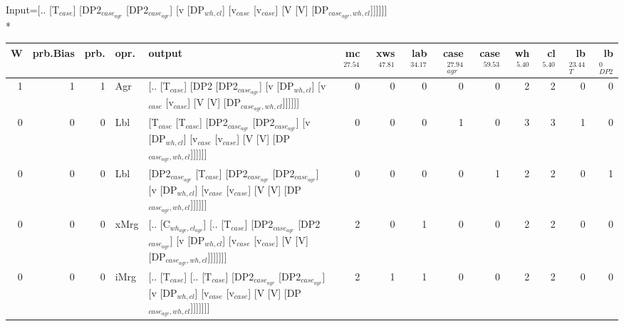 \begingroup\scriptsize Input=[.. [T$_{case}$] [DP2$_{case_{agr}}$ [DP2$_{case_{agr}}$] [v [DP$_{wh,cl}$] [v$_{case}$ [v$_{case}$] [V [V] [DP$_{case_{agr},wh,cl}$]]]]]]\\*
\begin{tabularx}{\linewidth}{rrrlXrrrrrrrrr}
\hline
   W &   prb.Bias &   prb. & opr.   & output                                                                                                                                                                                                   &   mc$^{27.54}$ &   xws$^{47.81}$ &   lab$^{34.17}$ &   case$_{agr}^{27.94}$ &   case$^{59.53}$ &   wh$^{5.40}$ &   cl$^{5.40}$ &   lb$_{T}^{23.44}$ &   lb$_{DP2}^{0}$ \\
\hline
   1 &       1 &   1 & Agr  & [.. [T$_{case}$] [DP2 [DP2$_{case_{agr}}$] [v [DP$_{wh,cl}$] [v$_{case}$ [v$_{case}$] [V [V] [DP$_{case_{agr},wh,cl}$]]]]]]                                                                                                          &            0 &             0 &             0 &                  0 &              0 &           2 &           2 &              0 &            0 \\
   0 &       0 &   0 & Lbl  & [T$_{case}$ [T$_{case}$] [DP2$_{case_{agr}}$ [DP2$_{case_{agr}}$] [v [DP$_{wh,cl}$] [v$_{case}$ [v$_{case}$] [V [V] [DP$_{case_{agr},wh,cl}$]]]]]]                                                                                             &            0 &             0 &             0 &                  1 &              0 &           3 &           3 &              1 &            0 \\
   0 &       0 &   0 & Lbl  & [DP2$_{case_{agr}}$ [T$_{case}$] [DP2$_{case_{agr}}$ [DP2$_{case_{agr}}$] [v [DP$_{wh,cl}$] [v$_{case}$ [v$_{case}$] [V [V] [DP$_{case_{agr},wh,cl}$]]]]]]                                                                                       &            0 &             0 &             0 &                  0 &              1 &           2 &           2 &              0 &            1 \\
   0 &       0 &   0 & xMrg & [.. [C$_{wh_{agr},cl_{agr}}$] [.. [T$_{case}$] [DP2$_{case_{agr}}$ [DP2$_{case_{agr}}$] [v [DP$_{wh,cl}$] [v$_{case}$ [v$_{case}$] [V [V] [DP$_{case_{agr},wh,cl}$]]]]]]]                                                                          &            2 &             0 &             1 &                  0 &              0 &           2 &           2 &              0 &            0 \\
   0 &       0 &   0 & iMrg & [.. [T$_{case}$] [.. [T$_{case}$] [DP2$_{case_{agr}}$ [DP2$_{case_{agr}}$] [v [DP$_{wh,cl}$] [v$_{case}$ [v$_{case}$] [V [V] [DP$_{case_{agr},wh,cl}$]]]]]]]                                                                                   &            2 &             1 &             1 &                  0 &              0 &           2 &           2 &              0 &            0 \\

\end{tabularx}
